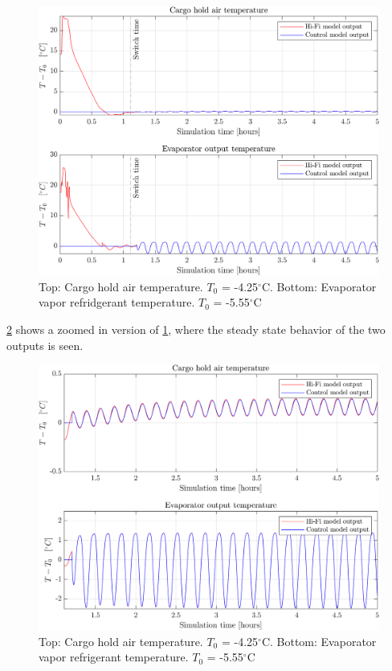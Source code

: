 \begin{figure}[h!]
	\centering
	\includegraphics[width=1\textwidth]{Graphics/fig_LQR_wellTuned_sineDist.png}
	\caption{Top: Cargo hold air temperature. $T_0$ = -4.25$^{\circ}$C. Bottom: Evaporator vapor refridgerant temperature. $T_0$ = -5.55$^{\circ}$C}
	\label{fig:LQR_wellTuned_sineDist}
\end{figure}

\cref{fig:LQR_wellTuned_sineDist_zoom} shows a zoomed in version of \cref{fig:LQR_wellTuned_sineDist}, where the steady state behavior of the two outputs is seen.\\


\begin{figure}[h!]
	\centering
	\includegraphics[width=1\textwidth]{Graphics/fig_LQR_wellTuned_sineDist_zoom.png}
	\caption{Top: Cargo hold air temperature. $T_0$ = -4.25$^{\circ}$C. Bottom: Evaporator vapor refrigerant temperature. $T_0$ = -5.55$^{\circ}$C}
	\label{fig:LQR_wellTuned_sineDist_zoom}
\end{figure}

